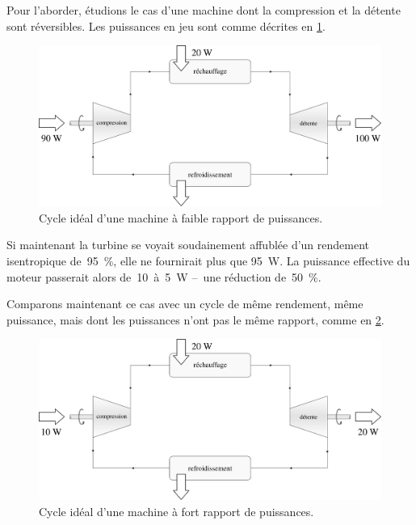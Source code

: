 		Pour l’aborder, étudions le cas d’une machine dont la compression et la détente sont réversibles. Les puissances en jeu sont comme décrites en \cref{fig_rapport_puissances_1}.

		\begin{figure}
			\begin{center}
				\includegraphics[width=\textwidth]{images/cours10-img3.png}
			\end{center}
			\caption{Cycle idéal d’une machine à faible rapport de puissances.}
			\label{fig_rapport_puissances_1}
		\end{figure}

		Si maintenant la turbine se voyait soudainement affublée d’un rendement isentropique de~\SI{95}{\percent}, elle ne fournirait plus que \SI{95}{\watt}. La puissance effective du moteur passerait alors de~\num{10}~à~\SI{5}{\watt} --\ une réduction de~\SI{50}{\percent}.

		Comparons maintenant ce cas avec un cycle de même rendement, même puissance, mais dont les puissances n’ont pas le même rapport, comme en \cref{fig_rapport_puissances_2}.

		\begin{figure}
			\begin{center}
				\includegraphics[width=\textwidth]{images/cours10-img4.png}
			\end{center}
			\caption{Cycle idéal d’une machine à fort rapport de puissances.}
			\label{fig_rapport_puissances_2}
		\end{figure}

